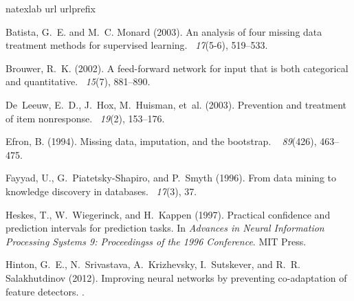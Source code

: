 \documentclass[10pt]{book}
\theoremstyle{definition}
\begin{document}
\clearpage

\bibhang=1.7pc
\bibsep=2pt
\fontsize{9}{14pt plus.8pt minus .6pt}\selectfont
\renewcommand\bibname{\large \bf References} 
\begin{thebibliography}{11}
\expandafter\ifx\csname
natexlab\endcsname\relax\def\natexlab#1{#1}\fi
\expandafter\ifx\csname url\endcsname\relax
  \def\url#1{\texttt{#1}}\fi
\expandafter\ifx\csname urlprefix\endcsname\relax\def\urlprefix{URL
}\fi

Batista, G.~E. and M.~C. Monard (2003).
\newblock An analysis of four missing data treatment methods for supervised
  learning.
~{\em 17\/}(5-6), 519--533.

Brouwer, R.~K. (2002).
\newblock A feed-forward network for input that is both categorical and
  quantitative.
~{\em 15\/}(7), 881--890.

De~Leeuw, E.~D., J.~Hox, M.~Huisman, et~al. (2003).
\newblock Prevention and treatment of item nonresponse.
~{\em 19\/}(2), 153--176.

Efron, B. (1994).
\newblock Missing data, imputation, and the bootstrap.
~{\em
  89\/}(426), 463--475.

Fayyad, U., G.~Piatetsky-Shapiro, and P.~Smyth (1996).
\newblock From data mining to knowledge discovery in databases.
~{\em 17\/}(3), 37.

Heskes, T., W.~Wiegerinck, and H.~Kappen (1997).
\newblock Practical confidence and prediction intervals for prediction tasks.
\newblock In {\em Advances in Neural Information Processing Systems 9:
  Proceedingss of the 1996 Conference}. MIT Press.

Hinton, G.~E., N.~Srivastava, A.~Krizhevsky, I.~Sutskever, and R.~R.
  Salakhutdinov (2012).
\newblock Improving neural networks by preventing co-adaptation of feature
  detectors.
.


\end{thebibliography}
\end{document}
